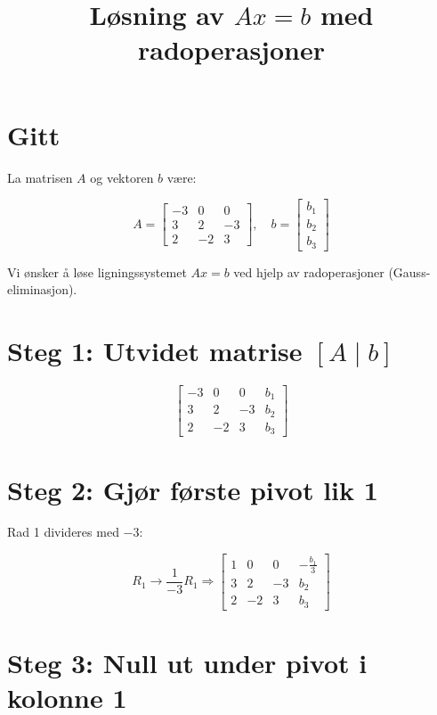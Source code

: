 \documentclass[a4paper,12pt]{article}
\title{Løsning av $Ax = b$ med radoperasjoner}
\author{}
\date{}
\begin{document}
\maketitle

\section*{Gitt}

La matrisen $A$ og vektoren $b$ være:

\[
A =
\begin{bmatrix}
-3 & 0 & 0 \\
3 & 2 & -3 \\
2 & -2 & 3
\end{bmatrix},
\quad
b =
\begin{bmatrix}
b_1 \\
b_2 \\
b_3
\end{bmatrix}
\]

Vi ønsker å løse ligningssystemet $Ax = b$ ved hjelp av radoperasjoner (Gauss-eliminasjon).

\section*{Steg 1: Utvidet matrise $[A \mid b]$}

\[
\left[
\begin{array}{ccc|c}
-3 & 0 & 0 & b_1 \\
3 & 2 & -3 & b_2 \\
2 & -2 & 3 & b_3
\end{array}
\right]
\]

\section*{Steg 2: Gjør første pivot lik 1}

Rad 1 divideres med $-3$:

\[
R_1 \rightarrow \frac{1}{-3} R_1
\Rightarrow
\left[
\begin{array}{ccc|c}
1 & 0 & 0 & -\frac{b_1}{3} \\
3 & 2 & -3 & b_2 \\
2 & -2 & 3 & b_3
\end{array}
\right]
\]

\section*{Steg 3: Null ut under pivot i kolonne 1}
\end{document}

